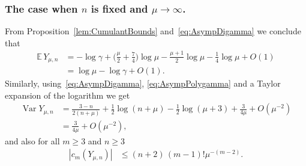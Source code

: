 \documentclass[AHL,Unicode,longabstracts,published]{cedram}
\newcommand{\EE}{\mathbb{E}\,}
\newcommand{\Var}{\mathop{\mathrm{Var}}\nolimits}
\begin{document}
\subsubsection{The case when $n$ is fixed and $\mu\rightarrow \infty$.}
From Proposition~\ref{lem:CumulantBounds} and~\eqref{eq:AsympDigamma} we conclude that
\begin{align*}
\EE Y_{\mu,n}&=-\log\gamma+\Big(\frac{\mu}{2}+\frac{7}{4}\Big)\log \mu-\frac{\mu+1}{2}\log \mu-\frac{1}{4}\log \mu+O(1)\\
&= \log \mu-\log\gamma+O(1).
\end{align*}
Similarly, using~\eqref{eq:AsympDigamma}, \eqref{eq:AsympPolygamma} and a Taylor expansion of the logarithm we get
\begin{align*}
\Var Y_{\mu,n}&=\frac{3-n}{2(n+\mu)}+\frac12\log(n+\mu)-\frac12\log(\mu+3)+\frac{3}{4\mu}+O\left(\mu^{-2}\right)\\
&=\frac{3}{4\mu}+O\left(\mu^{-2}\right),
\end{align*}
and also for all $m\geq 3$ and $n\geq 3$
\begin{align*}
|c_m(Y_{\mu,n})|&\leq (n+2)\,(m-1)!\mu^{-(m-2)}.
\end{align*}
\end{document}
